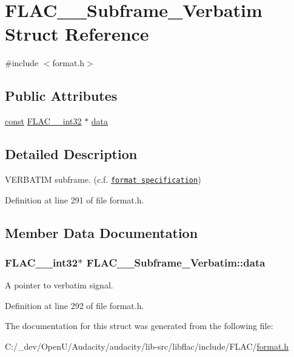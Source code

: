 \hypertarget{struct_f_l_a_c_____subframe___verbatim}{}\section{F\+L\+A\+C\+\_\+\+\_\+\+Subframe\+\_\+\+Verbatim Struct Reference}
\label{struct_f_l_a_c_____subframe___verbatim}


{\ttfamily \#include $<$format.\+h$>$}

\subsection*{Public Attributes}
\begin{DoxyCompactItemize}
\item 
\hyperlink{getopt1_8c_a2c212835823e3c54a8ab6d95c652660e}{const} \hyperlink{ordinals_8h_a33fd77bfe6d685541a0c034a75deccdc}{F\+L\+A\+C\+\_\+\+\_\+int32} $\ast$ \hyperlink{struct_f_l_a_c_____subframe___verbatim_a6abc78689650804550ac517ada884584}{data}
\end{DoxyCompactItemize}


\subsection{Detailed Description}
V\+E\+R\+B\+A\+T\+IM subframe. (c.\+f. \href{../format.html#subframe_verbatim}{\tt format specification}) 

Definition at line 291 of file format.\+h.



\subsection{Member Data Documentation}
\subsubsection[{\texorpdfstring{data}{data}}]{ {\bf F\+L\+A\+C\+\_\+\+\_\+int32}$\ast$ F\+L\+A\+C\+\_\+\+\_\+\+Subframe\+\_\+\+Verbatim\+::data}\hypertarget{struct_f_l_a_c_____subframe___verbatim_a6abc78689650804550ac517ada884584}{}\label{struct_f_l_a_c_____subframe___verbatim_a6abc78689650804550ac517ada884584}
A pointer to verbatim signal. 

Definition at line 292 of file format.\+h.



The documentation for this struct was generated from the following file\+:\begin{DoxyCompactItemize}
\item 
C\+:/\+\_\+dev/\+Open\+U/\+Audacity/audacity/lib-\/src/libflac/include/\+F\+L\+A\+C/\hyperlink{include_2_f_l_a_c_2format_8h}{format.\+h}\end{DoxyCompactItemize}
